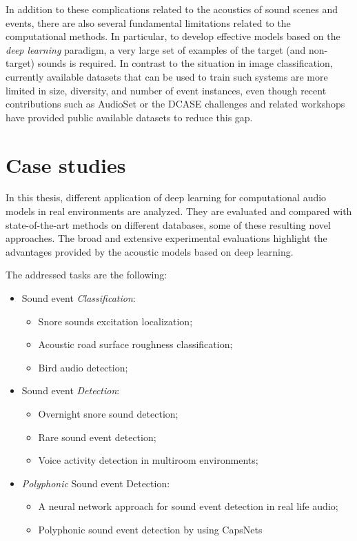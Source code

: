 In addition to these complications related to the acoustics of sound scenes and
events, there are also several fundamental limitations related to the computational methods. In particular, to develop effective models based on the \textit{deep learning} paradigm, a very large set of examples of the
target (and non-target) sounds is required. In contrast to the situation in image classification, currently available datasets that can be used to train such systems are more limited in size, diversity, and number of event instances, even though recent contributions such as AudioSet \cite{gemmeke2017audio} or the DCASE challenges
and related workshops \cite{DCASE2017Workshop, mesaros2016tut, dcase2018web} have provided public available datasets to reduce this gap.




\section{Case studies}
In this thesis, different application of deep learning for computational audio models in real environments are analyzed. They are evaluated and compared with state-of-the-art methods on different databases, some of these resulting novel approaches. The broad and extensive experimental evaluations highlight the advantages provided by the acoustic models based on deep learning.

The addressed tasks are the following:
\begin{itemize}
	\item Sound event \textit{Classification}:
	\begin{itemize}
		\item Snore sounds excitation localization;
		\item Acoustic road surface roughness classification;
		\item Bird audio detection;
	\end{itemize}
	\item Sound event \textit{Detection}:
	\begin{itemize}
		\item Overnight snore sound detection;
		\item Rare sound event detection;
		\item Voice activity detection in multiroom environments;
	\end{itemize}
	\item \textit{Polyphonic} Sound event Detection:
	\begin{itemize}
		\item A neural network approach for sound event detection in real life audio;
		\item Polyphonic sound event detection by using CapsNets		
	\end{itemize}
\end{itemize}




